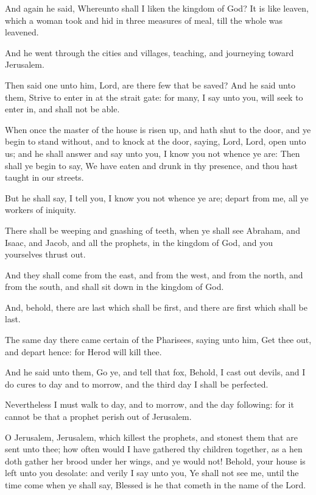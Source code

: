 \verse And again he said, Whereunto shall I liken the kingdom of God?  \verse It is like leaven, which a woman took and hid in three measures of meal, till the whole was leavened.

\verse And he went through the cities and villages, teaching, and journeying toward Jerusalem.

\verse Then said one unto him, Lord, are there few that be saved? And he said unto them, \verse Strive to enter in at the strait gate: for many, I say unto you, will seek to enter in, and shall not be able.

\verse When once the master of the house is risen up, and hath shut to the door, and ye begin to stand without, and to knock at the door, saying, Lord, Lord, open unto us; and he shall answer and say unto you, I know you not whence ye are: \verse Then shall ye begin to say, We have eaten and drunk in thy presence, and thou hast taught in our streets.

\verse But he shall say, I tell you, I know you not whence ye are; depart from me, all ye workers of iniquity.

\verse There shall be weeping and gnashing of teeth, when ye shall see Abraham, and Isaac, and Jacob, and all the prophets, in the kingdom of God, and you yourselves thrust out.

\verse And they shall come from the east, and from the west, and from the north, and from the south, and shall sit down in the kingdom of God.

\verse And, behold, there are last which shall be first, and there are first which shall be last.

\verse The same day there came certain of the Pharisees, saying unto him, Get thee out, and depart hence: for Herod will kill thee.

\verse And he said unto them, Go ye, and tell that fox, Behold, I cast out devils, and I do cures to day and to morrow, and the third day I shall be perfected.

\verse Nevertheless I must walk to day, and to morrow, and the day following: for it cannot be that a prophet perish out of Jerusalem.

\verse O Jerusalem, Jerusalem, which killest the prophets, and stonest them that are sent unto thee; how often would I have gathered thy children together, as a hen doth gather her brood under her wings, and ye would not!  \verse Behold, your house is left unto you desolate: and verily I say unto you, Ye shall not see me, until the time come when ye shall say, Blessed is he that cometh in the name of the Lord.


